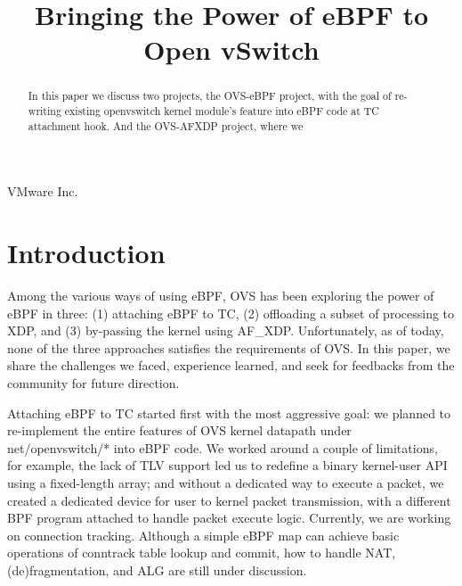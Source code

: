\documentclass[10pt]{sigplanconf}
\begin{document}
\title{Bringing the Power of eBPF to Open vSwitch}
{VMware Inc.}{}

\maketitle

\begin{abstract}
In this paper we discuss two projects, the OVS-eBPF project, with
the goal of re-writing existing openvswitch kernel module's feature
into eBPF code at TC attachment hook.
And the OVS-AFXDP project, where we 


\end{abstract}

\section{Introduction}\label{introduction}
Among the various ways of using eBPF, OVS has been exploring the power of eBPF in three:
(1) attaching eBPF to TC, (2) offloading a subset of processing to XDP, and (3) by-passing
the kernel using AF\_XDP. Unfortunately, as of today, none of the three approaches satisfies
the requirements of OVS. In this paper, we share the challenges we faced, experience learned,
and seek for feedbacks from the community for future direction.

Attaching eBPF to TC started first with the most aggressive goal: we planned to re-implement
the entire features of OVS kernel datapath under net/openvswitch/* into eBPF code.
We worked around a couple of limitations, for example, the lack of TLV support led us to
redefine a binary kernel-user API using a fixed-length array; and without a dedicated way to
execute a packet, we created a dedicated device for user to kernel packet transmission,
with a different BPF program attached to handle packet execute logic.
Currently, we are working on connection tracking.
Although a simple eBPF map can achieve basic operations of conntrack table lookup and commit,
how to handle NAT, (de)fragmentation, and ALG are still under discussion.
\end{document}
